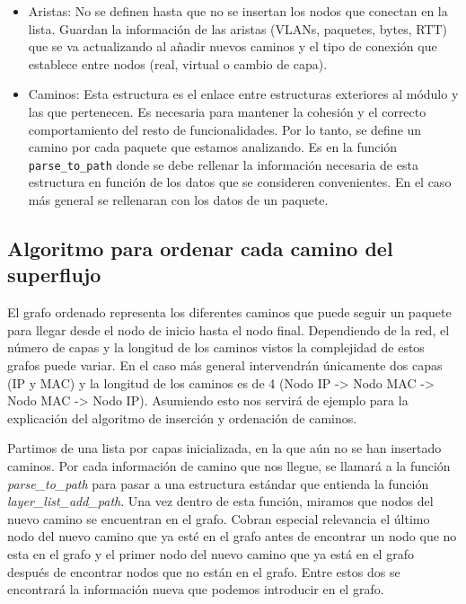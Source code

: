 \documentclass[twoside, 12pt]{epstfg}
\begin{document}
\begin{itemize}
    \item Aristas: No se definen hasta que no se insertan los nodos que conectan en la lista. Guardan la información de las aristas (VLANs, paquetes, bytes, RTT) que se va actualizando al añadir nuevos caminos y el tipo de conexión que establece entre nodos (real, virtual o cambio de capa).
    \item Caminos: Esta estructura es el enlace entre estructuras exteriores al módulo y las que pertenecen. Es necesaria para mantener la cohesión y el correcto comportamiento del resto de funcionalidades. Por lo tanto, se define un camino por cada paquete que estamos analizando. Es en la función \texttt{parse\_to\_path} donde se debe rellenar la información necesaria de esta estructura en función de los datos que se consideren convenientes. En el caso más general se rellenaran con los datos de un paquete.
\end{itemize}

\subsection{Algoritmo para ordenar cada camino del superflujo}
El grafo ordenado representa los diferentes caminos que puede seguir un paquete para llegar desde el nodo de inicio hasta el nodo final. Dependiendo de la red, el número de capas y la longitud de los caminos vistos la complejidad de estos grafos puede variar. En el caso más general intervendrán únicamente dos capas (IP y MAC) y la longitud de los caminos es de 4 (Nodo IP -> Nodo MAC -> Nodo MAC -> Nodo IP). Asumiendo esto nos servirá de ejemplo para la explicación del algoritmo de inserción y ordenación de caminos.

Partimos de una lista por capas inicializada, en la que aún no se han insertado caminos. Por cada información de camino que nos llegue, se llamará a la función \textit{parse\_to\_path} para pasar a una estructura estándar que entienda la función \textit{layer\_list\_add\_path}. Una vez dentro de esta función, miramos que nodos del nuevo camino se encuentran en el grafo. Cobran especial relevancia el último nodo del nuevo camino que ya esté en el grafo antes de encontrar un nodo que no esta en el grafo y el primer nodo del nuevo camino que ya está en el grafo después de encontrar nodos que no están en el grafo. Entre estos dos se encontrará la información nueva que podemos introducir en el grafo.
\end{document}
